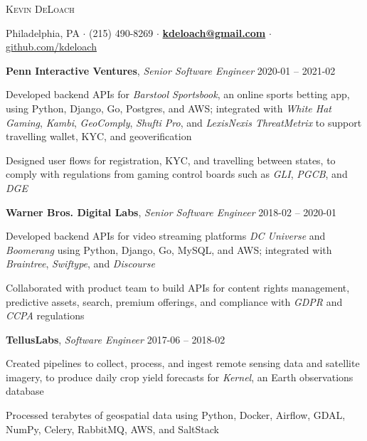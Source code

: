 \documentclass[12pt,a4paper]{article}
\newcommand{\sectionhead}{\normalfont\normalsize\scshape}
\newcommand{\workhead}[3]{\textbf{#1}, \emph{#2} \hfill #3}
\newcommand{\li}{\item[--]}
\begin{document}
\begin{center}
\noindent
{\huge\textsc{Kevin DeLoach}}

\vspace{2mm}

\noindent
Philadelphia, PA
$\cdot$
(215) 490-8269
$\cdot$
\href{mailto:kdeloach@gmail.com}{\bfseries kdeloach@gmail.com}
$\cdot$
\href{https://github.com/kdeloach}{github.com/kdeloach}
\end{center}

\noindent\hrulefill

\begin{description}[leftmargin=0em]
    \itemsep0pt
    \parskip3pt

    \item
        \workhead{Penn Interactive Ventures}{Senior Software Engineer}{2020-01 -- 2021-02}
        \begin{itemize*}
            \li Developed backend APIs for \emph{Barstool Sportsbook}, an online sports betting app, using Python, Django, Go, Postgres, and AWS; integrated with \emph{White Hat Gaming}, \emph{Kambi}, \emph{GeoComply}, \emph{Shufti Pro}, and \emph{LexisNexis ThreatMetrix} to support travelling wallet, KYC, and geoverification
            \li Designed user flows for registration, KYC, and travelling between states, to comply with regulations from gaming control boards such as \emph{GLI}, \emph{PGCB}, and \emph{DGE}
        \end{itemize*}

    \item
        \workhead{Warner Bros. Digital Labs}{Senior Software Engineer}{2018-02 -- 2020-01}
        \begin{itemize*}
            \li Developed backend APIs for video streaming platforms \emph{DC Universe} and \emph{Boomerang} using Python, Django, Go, MySQL, and AWS; integrated with \emph{Braintree}, \emph{Swiftype}, and \emph{Discourse}
            \li Collaborated with product team to build APIs for content rights management, predictive assets, search, premium offerings, and compliance with \emph{GDPR} and \emph{CCPA} regulations
        \end{itemize*}

    \item
        \workhead{TellusLabs}{Software Engineer}{2017-06 -- 2018-02}
        \begin{itemize*}
            \li Created pipelines to collect, process, and ingest remote sensing data and satellite imagery, to produce daily crop yield forecasts for \emph{Kernel}, an Earth observations database
            \li Processed terabytes of geospatial data using Python, Docker, Airflow, GDAL, NumPy, \mbox{Celery}, RabbitMQ, AWS, and SaltStack
        \end{itemize*}


\end{description}
\end{document}
